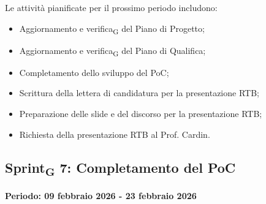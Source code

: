 \documentclass[11pt,a4paper]{article}
\newcommand{\gls}[1]{#1\textsubscript{G}}
\begin{document}
Le attività pianificate per il prossimo periodo includono:
\begin{itemize}
    \item Aggiornamento e \gls{verifica} del Piano di Progetto;
    \item Aggiornamento e \gls{verifica} del Piano di Qualifica;
    \item Completamento dello sviluppo del PoC;
    \item Scrittura della lettera di candidatura per la presentazione RTB;
    \item Preparazione delle slide e del discorso per la presentazione RTB;
    \item Richiesta della presentazione RTB al Prof. Cardin.
\end{itemize}

\newpage
\subsection{\gls{Sprint} 7: Completamento del PoC}
{\textbf{Periodo: 09 febbraio 2026 - 23 febbraio 2026}\par}
\end{document}
